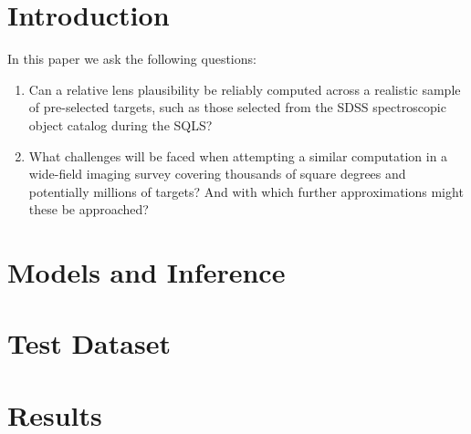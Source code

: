 \documentclass[useAMS,usenatbib]{mn2e}
\begin{document}
\setcounter{footnote}{1}


\section{Introduction}
\label{sec:intro}

In this paper we ask the following questions:

\begin{enumerate}

\item Can a relative lens plausibility be reliably computed across a
realistic sample of pre-selected targets, such as those selected from the SDSS
spectroscopic object catalog during the SQLS?

\item What challenges will be faced when attempting a similar computation in a
wide-field imaging survey covering thousands of square degrees and potentially
millions of targets? And with which further approximations might these be
approached?

\end{enumerate}




\section{Models and Inference}
\label{sec:model}



\section{Test Dataset}
\label{sec:data}



\section{Results}
\label{sec:results}
\end{document}

